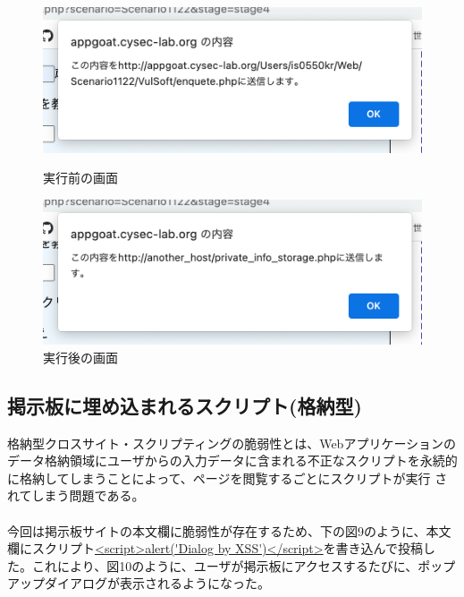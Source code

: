 \documentclass[dvipdfmx,autodetect-engine,titlepage]{jsarticle}
\begin{document}
\begin{figure}[H]
  \centering
  \begin{minipage}[b]{0.45\linewidth}
  \begin{center}
    \includegraphics[keepaspectratio,scale=0.4]{web7.png}
    \end{center}
    \caption{実行前の画面}
  \end{minipage}
  \begin{minipage}[b]{0.45\linewidth}
  \begin{center}
    \includegraphics[keepaspectratio,scale=0.4]{web8.png}
    \end{center}
    \caption{実行後の画面}
  \end{minipage}
\end{figure}

\subsection{掲示板に埋め込まれるスクリプト(格納型)}
格納型クロスサイト・スクリプティングの脆弱性とは、Webアプリケーションのデータ格納領域にユーザからの入力データに含まれる不正なスクリプトを永続的に格納してしまうことによって、ページを閲覧するごとにスクリプトが実行
されてしまう問題である。\\\\今回は掲示板サイトの本文欄に脆弱性が存在するため、下の図9のように、本文欄にスクリプト\url{<script>alert('Dialog by XSS')</script>}を書き込んで投稿した。これにより、図10のように、ユーザが掲示板にアクセスするたびに、ポップアップダイアログが表示されるようになった。
\end{document}
